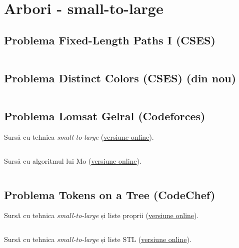 \documentclass[../main.tex]{subfiles}
\begin{document}
\chapter{Arbori - small-to-large}

\section{Problema Fixed-Length Paths I (CSES)}
\label{code:fixed-length-paths-1}

\inputminted{cpp}{../src/trees/fixed-length-paths-1.cpp}

\section{Problema Distinct Colors (CSES) (din nou)}
\label{code:distinct-colors-small-to-large}

\inputminted{cpp}{../src/trees/distinct-colors-small-to-large.cpp}

\section{Problema Lomsat Gelral (Codeforces)}
\label{code:lomsat-gelral}

Sursă cu tehnica \textit{small-to-large} (\href{https://codeforces.com/contest/600/submission/293980175}{versiune online}).

\inputminted{cpp}{../src/trees/lomsat-gelral-small-to-large.cpp}

Sursă cu algoritmul lui Mo (\href{https://codeforces.com/contest/600/submission/357014139}{versiune online}).

\inputminted{cpp}{../src/trees/lomsat-gelral-mo.cpp}

\section{Problema Tokens on a Tree (CodeChef)}
\label{code:tokens-on-a-tree}

Sursă cu tehnica \textit{small-to-large} și liste proprii (\href{https://www.codechef.com/viewsolution/1224713386}{versiune online}).

\inputminted{cpp}{../src/trees/tokens-on-a-tree-1.cpp}

Sursă cu tehnica \textit{small-to-large} și liste STL (\href{https://www.codechef.com/viewsolution/1111573335}{versiune online}).
\end{document}
